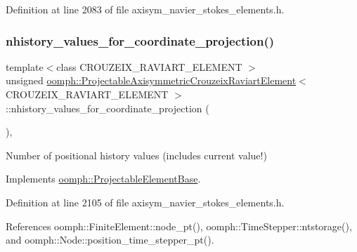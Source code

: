 Definition at line 2083 of file axisym\+\_\+navier\+\_\+stokes\+\_\+elements.\+h.

\mbox{\label{classoomph_1_1ProjectableAxisymmetricCrouzeixRaviartElement_a35e03deddcaceaea1909cfe14df631dd}} 
\subsubsection{\texorpdfstring{nhistory\+\_\+values\+\_\+for\+\_\+coordinate\+\_\+projection()}{nhistory\_values\_for\_coordinate\_projection()}}
{\footnotesize\ttfamily template$<$class C\+R\+O\+U\+Z\+E\+I\+X\+\_\+\+R\+A\+V\+I\+A\+R\+T\+\_\+\+E\+L\+E\+M\+E\+NT $>$ \\
unsigned \hyperlink{classoomph_1_1ProjectableAxisymmetricCrouzeixRaviartElement}{oomph\+::\+Projectable\+Axisymmetric\+Crouzeix\+Raviart\+Element}$<$ C\+R\+O\+U\+Z\+E\+I\+X\+\_\+\+R\+A\+V\+I\+A\+R\+T\+\_\+\+E\+L\+E\+M\+E\+NT $>$\+::nhistory\+\_\+values\+\_\+for\+\_\+coordinate\+\_\+projection (\begin{DoxyParamCaption}{ }\end{DoxyParamCaption})\hspace{0.3cm}{\ttfamily [inline]}, {\ttfamily [virtual]}}



Number of positional history values (includes current value!) 



Implements \hyperlink{classoomph_1_1ProjectableElementBase_ab4ecd0cd24000a3ed675dc7198203c1f}{oomph\+::\+Projectable\+Element\+Base}.



Definition at line 2105 of file axisym\+\_\+navier\+\_\+stokes\+\_\+elements.\+h.



References oomph\+::\+Finite\+Element\+::node\+\_\+pt(), oomph\+::\+Time\+Stepper\+::ntstorage(), and oomph\+::\+Node\+::position\+\_\+time\+\_\+stepper\+\_\+pt().

